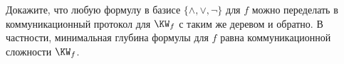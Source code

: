 Докажите, что любую формулу в базисе $\{\land, \lor, \neg\}$ для $f$ можно переделать в коммуникационный
протокол для $\KW_f$ с таким же деревом и обратно. В частности, минимальная глубина формулы для $f$ равна
коммуникационной сложности $\KW_f$.
